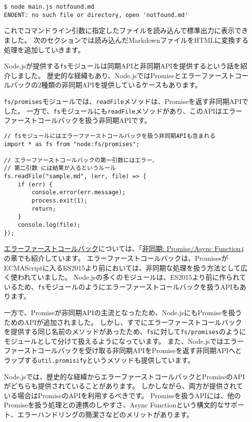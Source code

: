 \begin{lstlisting}
$ node main.js notfound.md
ENOENT: no such file or directory, open 'notfound.md'
\end{lstlisting}

これでコマンドライン引数に指定したファイルを読み込んで標準出力に表示できました。
次のセクションでは読み込んだMarkdownファイルをHTMLに変換する処理を追加していきます。

\begin{tcolorbox}[enhanced jigsaw,breakable,title=Node.jsのエラーファーストコールバック]\label{node-error-first-callbak}

Node.jsが提供する\texttt{fs}モジュールは同期APIと非同期APIを提供するという話を紹介しました。
歴史的な経緯もあり、Node.jsではPromiseとエラーファーストコールバックの2種類の非同期APIを提供しているケースもあります。

\texttt{fs/promises}モジュールでは、\texttt{readFile}メソッドは、Promiseを返す非同期APIでした。
一方で、\texttt{fs}モジュールにも\texttt{readFile}メソッドがあり、このAPIはエラーファーストコールバックを扱う非同期APIです。

\begin{lstlisting}
// fsモジュールにはエラーファーストコールバックを扱う非同期APIも含まれる
import * as fs from "node:fs/promises";

// エラーファーストコールバックの第一引数にはエラー、
// 第二引数 には結果が入るというルール
fs.readFile("sample.md", (err, file) => {
    if (err) {
        console.error(err.message);
        process.exit(1);
        return;
    }
    console.log(file);
});
\end{lstlisting}

\hyperlink{error-first-callback}{エラーファーストコールバック}については、「\hyperlink{async-handling}{非同期: Promise/Async Function}」の章でも紹介しています。
エラーファーストコールバックは、PromisesがECMAScriptに入るES2015より前においては、非同期な処理を扱う方法として広く使われていました。
Node.jsの多くのモジュールは、ES2015より前に作られているため、\texttt{fs}モジュールのようにエラーファーストコールバックを扱うAPIもあります。

一方で、Promiseが非同期APIの主流となったため、Node.jsにもPromiseを扱うためのAPIが追加されました。
しかし、すでにエラーファーストコールバックを提供する同じ名前のメソッドがあったため、\texttt{fs}に対して\texttt{fs/promises}のようにモジュールとして分けて扱えるようになっています。
また、Node.jsではエラーファーストコールバックを受け取る非同期APIをPromiseを返す非同期APIへとラップする\texttt{util.promisify}というメソッドも提供しています。

Node.jsでは、歴史的な経緯からエラーファーストコールバックとPromiseのAPIがどちらも提供されていることがあります。
しかしながら、両方が提供されている場合はPromiseのAPIを利用するべきです。
Promiseを扱うAPIには、他のPromiseを扱う処理との連携のしやすさ、Async Functionという構文的なサポート、エラーハンドリングの簡潔さなどのメリットがあります。
\end{tcolorbox}


